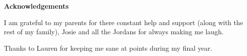 \thispagestyle{empty}

\begin{center}
    {\LARGE\bf Acknowledgements}
\end{center}

I am grateful to my parents for there constant help and support (along with the rest of my family), Josie and all the Jordans for always making me laugh.

Thanks to Lauren for keeping me sane at points during my final year.
